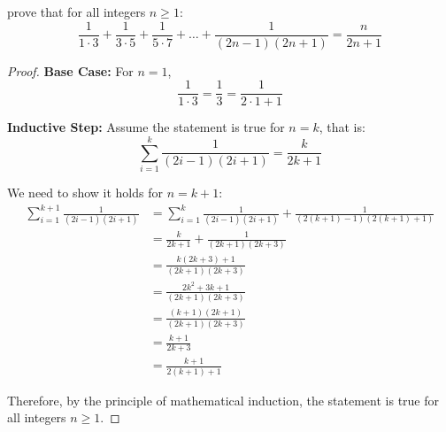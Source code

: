 \documentclass[
	12pt, %
	fleqn, %
	a4paper, %
]{LegrandOrangeBook}
\begin{document}
\begin{exercise}
    prove that for all integers $n \geq 1$:
\[
\frac{1}{1 \cdot 3} + \frac{1}{3 \cdot 5} + \frac{1}{5 \cdot 7} + \dots + \frac{1}{(2n - 1)(2n + 1)} = \frac{n}{2n + 1}
\]
\end{exercise}
\begin{proof}
    \textbf{Base Case:} For $n=1$,
    \begin{equation*}
    \frac{1}{1\cdot 3} = \frac{1}{3} = \frac{1}{2 \cdot 1 + 1}
    \end{equation*}
    
    \textbf{Inductive Step:} Assume the statement is true for $n=k$, that is:
    \begin{equation*}
    \sum_{i=1}^{k} \frac{1}{(2i-1)(2i+1)} = \frac{k}{2k+1}
    \end{equation*}
    
    We need to show it holds for $n=k+1$:
    \begin{align*}
    \sum_{i=1}^{k+1} \frac{1}{(2i-1)(2i+1)} &= \sum_{i=1}^{k} \frac{1}{(2i-1)(2i+1)} + \frac{1}{(2(k+1)-1)(2(k+1)+1)} \\
    &= \frac{k}{2k+1} + \frac{1}{(2k+1)(2k+3)} \\
    &= \frac{k(2k+3) + 1}{(2k+1)(2k+3)} \\
    &= \frac{2k^2 + 3k + 1}{(2k+1)(2k+3)} \\
    &= \frac{(k+1)(2k+1)}{(2k+1)(2k+3)} \\
    &= \frac{k+1}{2k+3} \\
    &= \frac{k+1}{2(k+1)+1}
    \end{align*}
    
    Therefore, by the principle of mathematical induction, the statement is true for all integers $n \geq 1$.
    
\end{proof}
\end{document}

